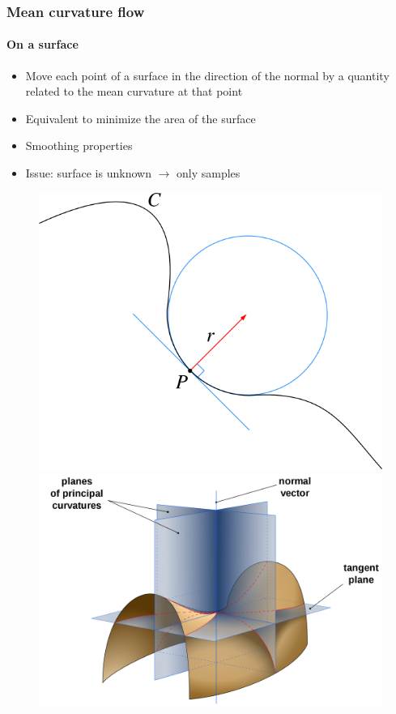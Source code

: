 \documentclass{beamer}
\begin{document}
\begin{frame}
    \frametitle{Mean curvature flow}
    \framesubtitle{On a surface}

    \begin{itemize}
        \item Move each point of a surface in the direction of the normal by a
            quantity related to the mean curvature at that point
        \item Equivalent to minimize the area of the surface
        \item Smoothing properties
        \item Issue: surface is unknown $ \to $ only samples
    \end{itemize}

    \begin{figure}
        \centering
        \includegraphics[scale=0.25]{img/osculating-circle}
        \includegraphics[scale=0.05]{img/curvatures-3d}

\end{figure}
\end{frame}
\end{document}
